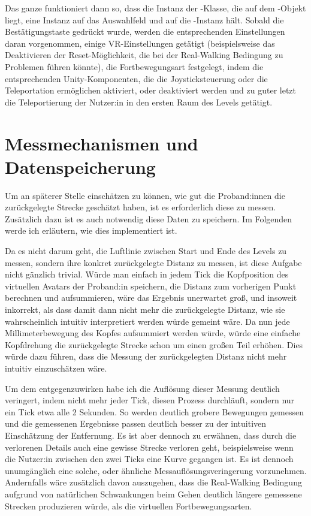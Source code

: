 Das ganze funktioniert dann so, dass die Instanz der -Klasse, die auf dem -Objekt liegt, eine Instanz auf das Auswahlfeld und auf die -Instanz hält. Sobald die Bestätigungstaste gedrückt wurde, werden die entsprechenden Einstellungen daran vorgenommen, einige VR-Einstellungen getätigt (beispielsweise das Deaktivieren der Reset-Möglichkeit, die bei der Real-Walking Bedingung zu Problemen führen könnte), die Fortbewegungsart festgelegt, indem die entsprechenden Unity-Komponenten, die die Joysticksteuerung oder die Teleportation ermöglichen aktiviert, oder deaktiviert werden und zu guter letzt die Teleportierung der Nutzer:in in den ersten Raum des Levels getätigt.

\section{Messmechanismen und Datenspeicherung} \label{sec:measure-distance}
Um an späterer Stelle einschätzen zu können, wie gut die Proband:innen die zurückgelegte Strecke geschätzt haben, ist es erforderlich diese zu messen. Zusätzlich dazu ist es auch notwendig diese Daten zu speichern. Im Folgenden werde ich erläutern, wie dies implementiert ist.

Da es nicht darum geht, die Luftlinie zwischen Start und Ende des Levels zu messen, sondern ihre konkret zurückgelegte Distanz zu messen, ist diese Aufgabe nicht gänzlich trivial. Würde man einfach in jedem Tick die Kopfposition des virtuellen Avatars der Proband:in speichern, die Distanz zum vorherigen Punkt berechnen und aufsummieren, wäre das Ergebnis unerwartet groß, und insoweit inkorrekt, als dass damit dann nicht mehr die zurückgelegte Distanz, wie sie wahrscheinlich intuitiv interpretiert werden würde gemeint wäre.
Da nun jede Millimeterbewegung des Kopfes aufsummiert werden würde, würde eine einfache Kopfdrehung die zurückgelegte Strecke schon um einen großen Teil erhöhen. Dies würde dazu führen, dass die Messung der zurückgelegten Distanz nicht mehr intuitiv einzuschätzen wäre.

Um dem entgegenzuwirken habe ich die Auflösung dieser Messung deutlich veringert, indem nicht mehr jeder Tick, diesen Prozess durchläuft, sondern nur ein Tick etwa alle 2 Sekunden. So werden deutlich grobere Bewegungen gemessen und die gemessenen Ergebnisse passen deutlich besser zu der intuitiven Einschätzung der Entfernung. Es ist aber dennoch zu erwähnen, dass durch die verlorenen Details auch eine gewisse Strecke verloren geht, beispielsweise wenn die Nutzer:in zwischen den zwei Ticks eine Kurve gegangen ist.
Es ist dennoch unumgänglich eine solche, oder ähnliche Messauflösungsveringerung vorzunehmen. Andernfalls wäre zusätzlich davon auszugehen, dass die Real-Walking Bedingung aufgrund von natürlichen Schwankungen beim Gehen deutlich längere gemessene Strecken produzieren würde, als die virtuellen Fortbewegungsarten.

